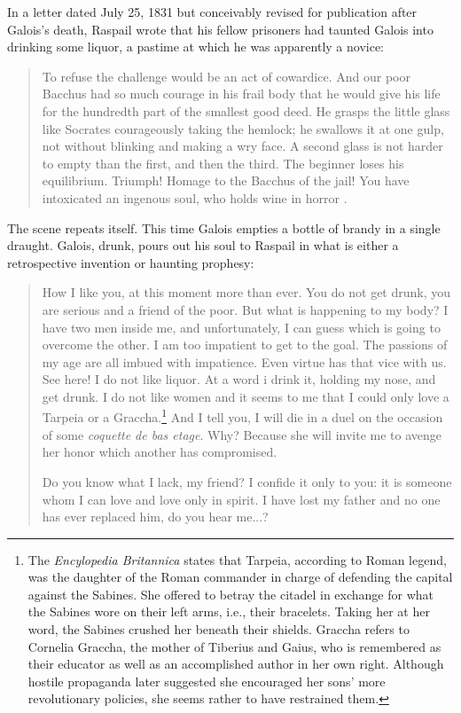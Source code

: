 \documentclass[12pt]{article}
\begin{document}
In a letter dated July 25, 1831 but conceivably revised for publication after Galois's death, Raspail wrote that his fellow prisoners had taunted Galois into drinking some liquor, a pastime at which he was apparently a novice:

\begin{quote}
To refuse the challenge would be an act of cowardice. And our poor Bacchus had so much courage in his frail body that he would give his life for the hundredth part of the smallest good deed. He grasps the little glass like Socrates courageously taking the hemlock; he swallows it at one gulp, not without blinking and making a wry face. A second glass is not harder to empty than the first, and then the third. The beginner loses his equilibrium. Triumph! Homage to the Bacchus of the jail! You have intoxicated an ingenous soul, who holds wine in horror \cite{62}.
\end{quote}

The scene repeats itself. This time Galois empties a bottle of brandy in a single draught. Galois, drunk, pours out his soul to Raspail in what is either a retrospective invention or haunting prophesy:

\begin{quotation}
How I like you, at this moment more than ever. You do not get drunk, you are serious and a friend of the poor. But what is happening to my body? I have two men inside me, and unfortunately, I can guess which is going to overcome the other. I am too impatient to get to the goal. The passions of my age are all imbued with impatience. Even virtue has that vice with us. See here! I do not like liquor. At a word i drink it, holding my nose, and get drunk. I do not like women and it seems to me that I could only love a Tarpeia or a Graccha.\footnote{The \emph{Encylopedia Britannica} states that Tarpeia, according to Roman legend, was the daughter of the Roman commander in charge of defending the capital against the Sabines. She offered to betray the citadel in exchange for what the Sabines wore on their left arms, i.e., their bracelets. Taking her at her word, the Sabines crushed her beneath their shields. Graccha refers to Cornelia Graccha, the mother of Tiberius and Gaius, who is remembered as their educator as well as an accomplished author in her own right. Although hostile propaganda later suggested she encouraged her sons' more revolutionary policies, she seems rather to have restrained them.} And I tell you, I will die in a duel on the occasion of some {\it coquette de bas etage}. Why? Because she will invite me to avenge her honor which another has compromised. 

Do you know what I lack, my friend? I confide it only to you: it is someone whom I can love and love only in spirit. I have lost my father and no one has ever replaced him, do you hear me...? \cite{63}

\end{quotation}
\end{document}
